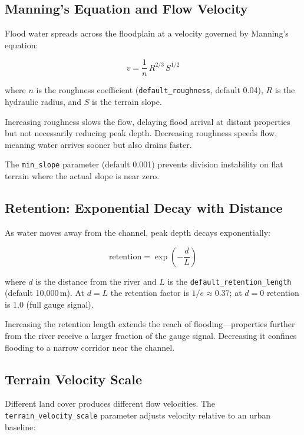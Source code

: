 \documentclass[11pt,a4paper]{article}
\begin{document}
\subsection{Manning's Equation and Flow Velocity}

Flood water spreads across the floodplain at a velocity governed by
Manning's equation:

\[
  v = \frac{1}{n}\, R^{2/3}\, S^{1/2}
\]

\noindent where $n$ is the roughness coefficient
(\texttt{default\_roughness}, default 0.04), $R$ is the hydraulic
radius, and $S$ is the terrain slope.

Increasing roughness slows the flow, delaying flood arrival at
distant properties but not necessarily reducing peak depth.  Decreasing
roughness speeds flow, meaning water arrives sooner but also drains
faster.

The \texttt{min\_slope} parameter (default 0.001) prevents division
instability on flat terrain where the actual slope is near zero.

\subsection{Retention: Exponential Decay with Distance}

As water moves away from the channel, peak depth decays exponentially:

\[
  \text{retention} = \exp\!\left(-\frac{d}{L}\right)
\]

\noindent where $d$ is the distance from the river and $L$ is the
\texttt{default\_retention\_length} (default 10,000\,m).  At $d = L$
the retention factor is $1/e \approx 0.37$; at $d = 0$ retention is
1.0 (full gauge signal).

Increasing the retention length extends the reach of flooding---properties
further from the river receive a larger fraction of the gauge signal.
Decreasing it confines flooding to a narrow corridor near the channel.

\subsection{Terrain Velocity Scale}

Different land cover produces different flow velocities.  The
\texttt{terrain\_velocity\_scale} parameter adjusts velocity relative
to an urban baseline:
\end{document}
